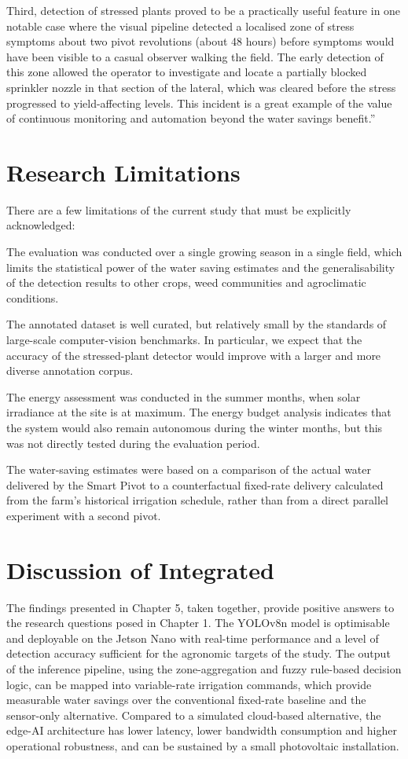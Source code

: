 \documentclass[12pt,a4paper]{report}
\begin{document}
Third, detection of stressed plants proved to be a practically useful feature in one notable case where the visual pipeline detected a localised zone of stress symptoms about two pivot revolutions (about 48 hours) before symptoms would have been visible to a casual observer walking the field. The early detection of this zone allowed the operator to investigate and locate a partially blocked sprinkler nozzle in that section of the lateral, which was cleared before the stress progressed to yield-affecting levels. This incident is a great example of the value of continuous monitoring and automation beyond the water savings benefit.''

\section{Research Limitations}

There are a few limitations of the current study that must be explicitly acknowledged:

The evaluation was conducted over a single growing season in a single field, which limits the statistical power of the water saving estimates and the generalisability of the detection results to other crops, weed communities and agroclimatic conditions.

The annotated dataset is well curated, but relatively small by the standards of large-scale computer-vision benchmarks. In particular, we expect that the accuracy of the stressed-plant detector would improve with a larger and more diverse annotation corpus.

The energy assessment was conducted in the summer months, when solar irradiance at the site is at maximum. The energy budget analysis indicates that the system would also remain autonomous during the winter months, but this was not directly tested during the evaluation period.

The water-saving estimates were based on a comparison of the actual water delivered by the Smart Pivot to a counterfactual fixed-rate delivery calculated from the farm's historical irrigation schedule, rather than from a direct parallel experiment with a second pivot.

\section{Discussion of Integrated}

The findings presented in Chapter 5, taken together, provide positive answers to the research questions posed in Chapter 1. The YOLOv8n model is optimisable and deployable on the Jetson Nano with real-time performance and a level of detection accuracy sufficient for the agronomic targets of the study. The output of the inference pipeline, using the zone-aggregation and fuzzy rule-based decision logic, can be mapped into variable-rate irrigation commands, which provide measurable water savings over the conventional fixed-rate baseline and the sensor-only alternative. Compared to a simulated cloud-based alternative, the edge-AI architecture has lower latency, lower bandwidth consumption and higher operational robustness, and can be sustained by a small photovoltaic installation.
\end{document}
